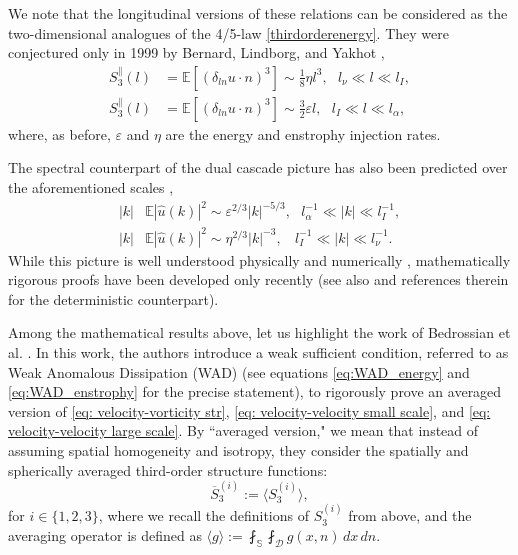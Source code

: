 \documentclass[11pt,a4paper]{article}
\numberwithin{equation}{section}
\numberwithin{theorem}{section}
\numberwithin{remark}{section}
\numberwithin{definition}{section}
\begin{document}
We note that the longitudinal versions of these relations can be considered as the two-dimensional analogues of the 4/5-law \eqref{thirdorderenergy}. They were conjectured only in 1999 by Bernard, Lindborg, and Yakhot \cite{bernard,lindborg,yakhot},
\begin{subequations}
\begin{align}
S_3^{\parallel}(l)&=\mathbb{E}\left[\left(\delta_{ln} u\cdot n \right)^3\right]\sim \frac{1}{8}\eta l^3, \ \ \
 l_\nu \ll l \ll l_I, \label{thirdorederenstrophy2d}\\
S_3^{\parallel}(l)&=\mathbb{E}\left[\left(\delta_{ln} u\cdot n \right)^3\right]\sim \frac{3}{2}\varepsilon l,  \ \ \ l_I \ll l \ll l_\alpha, \label{thirdorederenergy2d}
\end{align}
\end{subequations}
where, as before, $\varepsilon$ and $\eta$ are the energy and enstrophy injection rates.

The spectral counterpart of the dual cascade picture has also been predicted over the aforementioned scales \cite{Batchelor2,Kraichnan},
\begin{subequations}
\begin{align}
    |k|&\mathbb{E}|\hat{u}(k)|^2\sim\varepsilon^{2/3}|k|^{-5/3},\ \ \ l^{-1}_{\alpha}\ll|k|\ll l^{-1}_I,\label{energyspectrum}\\
    |k|&\mathbb{E}|\hat{u}(k)|^2\sim\eta^{2/3}|k|^{-3},\ \ \ \ l^{-1}_{I}\ll|k|\ll l^{-1}_\nu.\label{enstrophyspectrum}
\end{align}
\end{subequations}
While this picture is well understood physically and numerically \cite{boffetta,vallis1}, mathematically rigorous proofs have been developed only recently \cite{bed3D,bed2D,dudley,pappa,papathanasiou,buler} (see also \cite{Novak} and references therein for the deterministic counterpart).  

Among the mathematical results above, let us highlight the work of Bedrossian et al. \cite{bed2D}. In this work, the authors introduce a weak sufficient condition, referred to as Weak Anomalous Dissipation (WAD) (see equations \eqref{eq:WAD_energy} and \eqref{eq:WAD_enstrophy} for the precise statement), to rigorously prove an averaged version of \eqref{eq: velocity-vorticity str}, \eqref{eq: velocity-velocity small scale}, and \eqref{eq: velocity-velocity large scale}. By ``averaged version," we mean that instead of assuming spatial homogeneity and isotropy, they consider the spatially and spherically averaged third-order structure functions: 
\begin{equation}
    \overline{S}^{(i)}_3  :=  \langle S^{(i)}_3 \rangle, 
\end{equation}
for $i \in \{1,2,3\}$, where we recall the definitions of $S_3^{(i)}$ from above, and the averaging operator is defined as $\langle g \rangle := \fint_{\mathbb{S}}  \fint_{\mathcal{D}} g(x,n) \, dx \, dn$.
\end{document}
